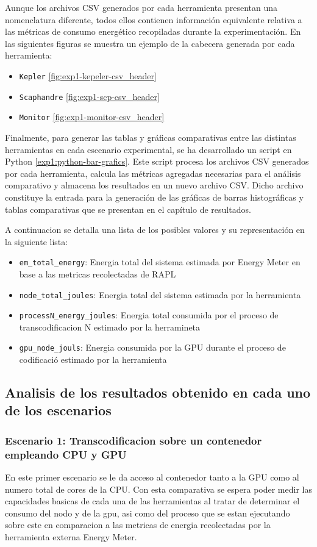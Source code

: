  Aunque los archivos CSV generados por cada herramienta presentan una nomenclatura diferente, todos ellos contienen información equivalente relativa a las métricas de consumo energético recopiladas durante la experimentación. En las siguientes figuras se muestra un ejemplo de la cabecera generada por cada herramienta:
 \begin{itemize}
     \item \texttt{Kepler} \ref{fig:exp1-kepeler-csv_header}
     \item \texttt{Scaphandre} \ref{fig:exp1-scp-csv_header}
     \item \texttt{Monitor} \ref{fig:exp1-monitor-csv_header}
     \end{itemize}

Finalmente, para generar las tablas y gráficas comparativas entre las distintas herramientas en cada escenario experimental, se ha desarrollado un script en Python \ref{exp1:python-bar-grafics}. Este script procesa los archivos CSV generados por cada herramienta, calcula las métricas agregadas necesarias para el análisis comparativo y almacena los resultados en un nuevo archivo CSV. Dicho archivo constituye la entrada para la generación de las gráficas de barras histográficas y tablas comparativas que se presentan en el capítulo de resultados. 

A continuacion se detalla una lista de los posibles valores y su representación en la siguiente lista:
\begin{itemize} 
 \item \texttt{em\_total\_energy}: Energia total del sistema estimada por Energy Meter en base a las metricas recolectadas de RAPL
 \item \texttt{node\_total\_joules}: Energia total del sistema estimada por la herramienta
 \item \texttt{processN\_energy\_joules}: Energia total consumida por el proceso de transcodificacion N estimado por la herramineta  
 \item \texttt{gpu\_node\_jouls}: Energia consumida por la GPU durante el proceso de codificació estimado por la herramienta
 \end{itemize}

\subsection{Analisis de los resultados obtenido en cada uno de los escenarios}
\subsubsection{Escenario 1: Transcodificacion sobre un contenedor empleando CPU y GPU}
 En este primer escenario se le da acceso al contenedor tanto a la GPU como al numero total de cores de la CPU. Con esta comparativa se espera poder medir las capacidades basicas de cada una de las herramientas al tratar de determinar el consumo del nodo y de la gpu, asi como del proceso que se estan ejecutando sobre este en comparacion a las metricas de energia recolectadas por la herramienta externa Energy Meter.

